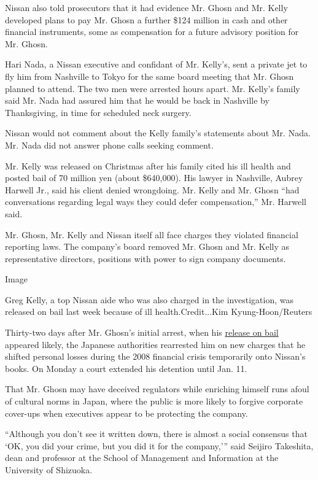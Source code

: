 Nissan also told prosecutors that it had evidence Mr. Ghosn and Mr.
Kelly developed plans to pay Mr. Ghosn a further \$124 million in cash
and other financial instruments, some as compensation for a future
advisory position for Mr. Ghosn.

Hari Nada, a Nissan executive and confidant of Mr. Kelly's, sent a
private jet to fly him from Nashville to Tokyo for the same board
meeting that Mr. Ghosn planned to attend. The two men were arrested
hours apart. Mr. Kelly's family said Mr. Nada had assured him that he
would be back in Nashville by Thanksgiving, in time for scheduled neck
surgery.

Nissan would not comment about the Kelly family's statements about Mr.
Nada. Mr. Nada did not answer phone calls seeking comment.

Mr. Kelly was released on Christmas after his family cited his ill
health and posted bail of 70 million yen (about \$640,000). His lawyer
in Nashville, Aubrey Harwell Jr., said his client denied wrongdoing. Mr.
Kelly and Mr. Ghosn ``had conversations regarding legal ways they could
defer compensation,'' Mr. Harwell said.

Mr. Ghosn, Mr. Kelly and Nissan itself all face charges they violated
financial reporting laws. The company's board removed Mr. Ghosn and Mr.
Kelly as representative directors, positions with power to sign company
documents.

Image

Greg Kelly, a top Nissan aide who was also charged in the investigation,
was released on bail last week because of ill health.Credit...Kim
Kyung-Hoon/Reuters

Thirty-two days after Mr. Ghosn's initial arrest, when his
\href{https://www.nytimes.com/2019/03/04/world/asia/carlos-ghosn-bail-japan.html?module=inline}{release
on bail} appeared likely, the Japanese authorities rearrested him on new
charges that he shifted personal losses during the 2008 financial crisis
temporarily onto Nissan's books. On Monday a court extended his
detention until Jan. 11.

That Mr. Ghosn may have deceived regulators while enriching himself runs
afoul of cultural norms in Japan, where the public is more likely to
forgive corporate cover-ups when executives appear to be protecting the
company.

``Although you don't see it written down, there is almost a social
consensus that `OK, you did your crime, but you did it for the
company,''' said Seijiro Takeshita, dean and professor at the School of
Management and Information at the University of Shizuoka.

